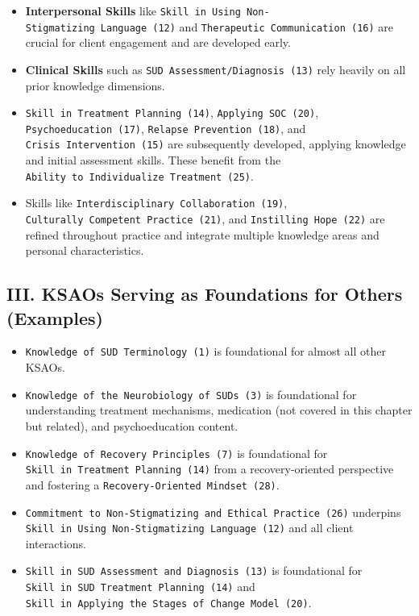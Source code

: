 \documentclass[
  letterpaper,
  DIV=11,
  numbers=noendperiod]{scrartcl}
\providecommand{\tightlist}{%
  \setlength{\itemsep}{0pt}\setlength{\parskip}{0pt}}
\begin{document}
\begin{enumerate}
  \begin{itemize}
  \tightlist
  \item
    \textbf{Interpersonal Skills} like
    \texttt{Skill\ in\ Using\ Non-Stigmatizing\ Language\ (12)} and
    \texttt{Therapeutic\ Communication\ (16)} are crucial for client
    engagement and are developed early.
  \item
    \textbf{Clinical Skills} such as
    \texttt{SUD\ Assessment/Diagnosis\ (13)} rely heavily on all prior
    knowledge dimensions.
  \item
    \texttt{Skill\ in\ Treatment\ Planning\ (14)},
    \texttt{Applying\ SOC\ (20)}, \texttt{Psychoeducation\ (17)},
    \texttt{Relapse\ Prevention\ (18)}, and
    \texttt{Crisis\ Intervention\ (15)} are subsequently developed,
    applying knowledge and initial assessment skills. These benefit from
    the \texttt{Ability\ to\ Individualize\ Treatment\ (25)}.
  \item
    Skills like \texttt{Interdisciplinary\ Collaboration\ (19)},
    \texttt{Culturally\ Competent\ Practice\ (21)}, and
    \texttt{Instilling\ Hope\ (22)} are refined throughout practice and
    integrate multiple knowledge areas and personal characteristics.
  \end{itemize}
\end{enumerate}

\subsection{III. KSAOs Serving as Foundations for Others
(Examples)}\label{iii.-ksaos-serving-as-foundations-for-others-examples}

\begin{itemize}
\tightlist
\item
  \texttt{Knowledge\ of\ SUD\ Terminology\ (1)} is foundational for
  almost all other KSAOs.
\item
  \texttt{Knowledge\ of\ the\ Neurobiology\ of\ SUDs\ (3)} is
  foundational for understanding treatment mechanisms, medication (not
  covered in this chapter but related), and psychoeducation content.
\item
  \texttt{Knowledge\ of\ Recovery\ Principles\ (7)} is foundational for
  \texttt{Skill\ in\ Treatment\ Planning\ (14)} from a recovery-oriented
  perspective and fostering a \texttt{Recovery-Oriented\ Mindset\ (28)}.
\item
  \texttt{Commitment\ to\ Non-Stigmatizing\ and\ Ethical\ Practice\ (26)}
  underpins \texttt{Skill\ in\ Using\ Non-Stigmatizing\ Language\ (12)}
  and all client interactions.
\item
  \texttt{Skill\ in\ SUD\ Assessment\ and\ Diagnosis\ (13)} is
  foundational for \texttt{Skill\ in\ SUD\ Treatment\ Planning\ (14)}
  and
  \texttt{Skill\ in\ Applying\ the\ Stages\ of\ Change\ Model\ (20)}.
\end{itemize}
\end{document}
